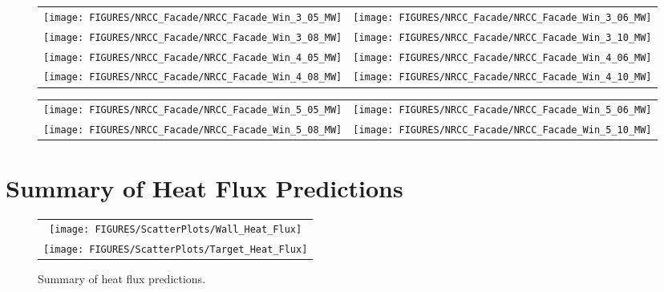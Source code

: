\begin{figure}[p]
\begin{tabular*}{\textwidth}{l@{\extracolsep{\fill}}r}
\texttt{[image: FIGURES/NRCC\_Facade/NRCC\_Facade\_Win\_3\_05\_MW]} &
\texttt{[image: FIGURES/NRCC\_Facade/NRCC\_Facade\_Win\_3\_06\_MW]} \\
\texttt{[image: FIGURES/NRCC\_Facade/NRCC\_Facade\_Win\_3\_08\_MW]} &
\texttt{[image: FIGURES/NRCC\_Facade/NRCC\_Facade\_Win\_3\_10\_MW]} \\
\texttt{[image: FIGURES/NRCC\_Facade/NRCC\_Facade\_Win\_4\_05\_MW]} &
\texttt{[image: FIGURES/NRCC\_Facade/NRCC\_Facade\_Win\_4\_06\_MW]} \\
\texttt{[image: FIGURES/NRCC\_Facade/NRCC\_Facade\_Win\_4\_08\_MW]} &
\texttt{[image: FIGURES/NRCC\_Facade/NRCC\_Facade\_Win\_4\_10\_MW]}
\end{tabular*}
\label{NRCC_Facade_2}
\end{figure}

\begin{figure}[p]
\begin{tabular*}{\textwidth}{l@{\extracolsep{\fill}}r}
\texttt{[image: FIGURES/NRCC\_Facade/NRCC\_Facade\_Win\_5\_05\_MW]} &
\texttt{[image: FIGURES/NRCC\_Facade/NRCC\_Facade\_Win\_5\_06\_MW]} \\
\texttt{[image: FIGURES/NRCC\_Facade/NRCC\_Facade\_Win\_5\_08\_MW]} &
\texttt{[image: FIGURES/NRCC\_Facade/NRCC\_Facade\_Win\_5\_10\_MW]}
\end{tabular*}
\label{NRCC_Facade_3}
\end{figure}

\clearpage

\section{Summary of Heat Flux Predictions}

\begin{figure}[h!]
\begin{center}
\begin{tabular}{c}
\texttt{[image: FIGURES/ScatterPlots/Wall\_Heat\_Flux]} \\
\texttt{[image: FIGURES/ScatterPlots/Target\_Heat\_Flux]}
\end{tabular}
\end{center}
\caption[Summary of heat flux predictions]
{Summary of heat flux predictions.}
\end{figure}



\clearpage

